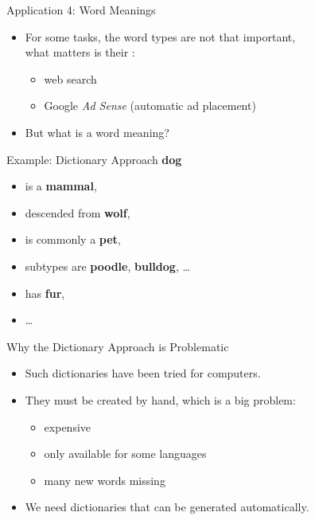 \documentclass[professionalfonts, xcolor={usenames,svgnames,x11names,table}]{beamer}
\begin{document}
\begin{frame}{Application 4: Word Meanings}
    \begin{itemize}
        \item For some tasks, the word types are not that important,\\
            what matters is their :
            \begin{itemize}
                \item web search
                \item Google \emph{Ad Sense} (automatic ad placement)
            \end{itemize}
        \item But what is a word meaning?
    \end{itemize}

    \begin{exampleblock}{Example: Dictionary Approach}
        \textbf{dog}
        \begin{itemize}
            \item is a \textbf{mammal},
            \item descended from \textbf{wolf},
            \item is commonly a \textbf{pet},
            \item subtypes are \textbf{poodle}, \textbf{bulldog}, \ldots
            \item has \textbf{fur},
            \item \ldots
        \end{itemize}
    \end{exampleblock}
\end{frame}

\begin{frame}{Why the Dictionary Approach is Problematic}
    \begin{itemize}
        \item Such dictionaries have been tried for computers.\\
        \item They must be created by hand, which is a big problem:
            \begin{itemize}
                \item expensive
                \item only available for some languages
                \item many new words missing
            \end{itemize}
        \item We need dictionaries that can be generated automatically.
    \end{itemize}
\end{frame}
\end{document}
